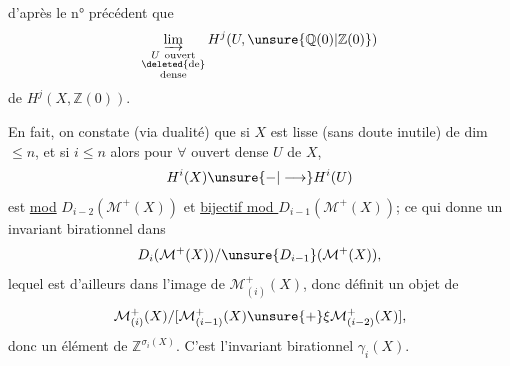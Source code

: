 d'après le n° précédent que 
\[
\varinjlim_{\substack{U\ \mathrm{ouvert}\\ \deleted{\mathrm{de}}\\ \mathrm{dense}}}
H^j(U,\unsure{\mathbb{Q}(0)|\mathbb{Z}(0)})
\]
de $H^j(X,\mathbb{Z}(0))$.

En fait, on constate (via dualité)
que si $X$ est lisse (sans doute
inutile) de dim $\leq n$, et si $i\leq n$
alors pour $\forall$ ouvert dense $U$ de $X$,
\[
H^i(X)\unsure{-|\longrightarrow}H^i(U)
\]
est \uline{ mod}
$D_{i-2}(\mathcal{M}^{+}(X))$ et
\uline{bijectif mod $D_{i-1}(\mathcal{M}^{+}(X))$}; ce qui
donne un invariant birationnel dans
\[
D_i(\mathcal{M}^{+}(X))/\unsure{D_{i-1}}(\mathcal{M}^{+}(X)),
\]
lequel
est d'ailleurs dans l'image de
$\mathcal{M}^{+}_{(i)}(X)$, donc définit un objet de
\[
\mathcal{M}^{+}_{(i)}(X)/
[\mathcal{M}^{+}_{(i-1)}(X)\unsure{+}\xi\mathcal{M}^{+}_{(i-2)}(X)],
\]
donc un
élément de $\mathbb{Z}^{\sigma_i(X)}$. C'est
l'invariant birationnel $\gamma_i(X)$.
